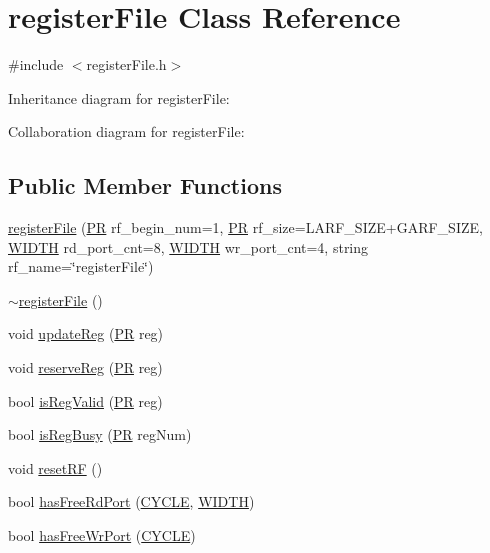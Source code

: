 \hypertarget{classregisterFile}{
\section{registerFile Class Reference}
\label{classregisterFile}
}


{\ttfamily \#include $<$registerFile.h$>$}



Inheritance diagram for registerFile:


Collaboration diagram for registerFile:
\subsection*{Public Member Functions}
\begin{DoxyCompactItemize}
\item 
\hyperlink{classregisterFile_aa9071035e97a10e7e76990c9b5e126fb}{registerFile} (\hyperlink{global_2global_8h_a54dcae2ba04c76c12afe113b706bd4dc}{PR} rf\_\-begin\_\-num=1, \hyperlink{global_2global_8h_a54dcae2ba04c76c12afe113b706bd4dc}{PR} rf\_\-size=LARF\_\-SIZE+GARF\_\-SIZE, \hyperlink{global_2global_8h_a6fa2e24b8a418fa215e183264cbea3aa}{WIDTH} rd\_\-port\_\-cnt=8, \hyperlink{global_2global_8h_a6fa2e24b8a418fa215e183264cbea3aa}{WIDTH} wr\_\-port\_\-cnt=4, string rf\_\-name=\char`\"{}registerFile\char`\"{})
\item 
\hyperlink{classregisterFile_a51d44388ce9baf55f5d0fc108198d915}{$\sim$registerFile} ()
\item 
void \hyperlink{classregisterFile_a57aa14508810da286ee60ef6cd033d6b}{updateReg} (\hyperlink{global_2global_8h_a54dcae2ba04c76c12afe113b706bd4dc}{PR} reg)
\item 
void \hyperlink{classregisterFile_a2731695462957c3ac0a8888e7fce3bd3}{reserveReg} (\hyperlink{global_2global_8h_a54dcae2ba04c76c12afe113b706bd4dc}{PR} reg)
\item 
bool \hyperlink{classregisterFile_a67c6a74ba45a273b0c57e29fe9cfc4eb}{isRegValid} (\hyperlink{global_2global_8h_a54dcae2ba04c76c12afe113b706bd4dc}{PR} reg)
\item 
bool \hyperlink{classregisterFile_af4bc17e8db0bd9a07fec85814e1d607f}{isRegBusy} (\hyperlink{global_2global_8h_a54dcae2ba04c76c12afe113b706bd4dc}{PR} regNum)
\item 
void \hyperlink{classregisterFile_a9e487acbcecb5a905a4ee1c80adf48e4}{resetRF} ()
\item 
bool \hyperlink{classregisterFile_a2f83eaee77e90587c8fabff35b6255c3}{hasFreeRdPort} (\hyperlink{global_2global_8h_a7e19a550ec11d1ed921deb20c22efb5b}{CYCLE}, \hyperlink{global_2global_8h_a6fa2e24b8a418fa215e183264cbea3aa}{WIDTH})
\item 
bool \hyperlink{classregisterFile_a5c361b0e1c0ec3e6f08990b63ffae8db}{hasFreeWrPort} (\hyperlink{global_2global_8h_a7e19a550ec11d1ed921deb20c22efb5b}{CYCLE})
\end{DoxyCompactItemize}


